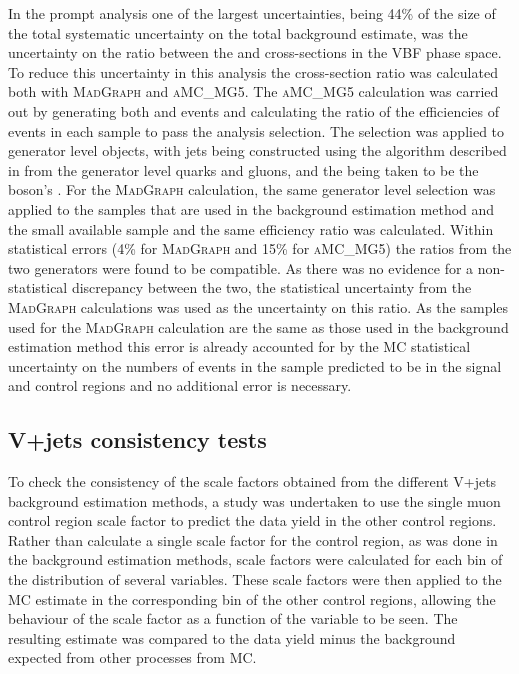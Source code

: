In the prompt analysis one of the largest uncertainties, being 44\% of the size of the total systematic uncertainty on the total background estimate, was the uncertainty on the ratio between the \Zmumu and \Znunu cross-sections in the \ac{VBF} phase space. To reduce this uncertainty in this analysis the cross-section ratio was calculated both with \textsc{MadGraph} and \textsc{aMC\@NLO\_MG5}. The \textsc{aMC\@NLO\_MG5} calculation was carried out by generating both \Zmumu and \Znunu events and calculating the ratio of the efficiencies of events in each sample to pass the analysis selection. The selection was applied to generator level objects, with jets being constructed using the algorithm described in  from the generator level quarks and gluons, and the \MET being taken to be the \PZ boson's \pt. For the \textsc{MadGraph} calculation, the same generator level selection was applied to the \Zmumu samples that are used in the background estimation method and the small available \Znunu sample and the same efficiency ratio was calculated. Within statistical errors (4\% for \textsc{MadGraph} and 15\% for \textsc{aMC\@NLO\_MG5}) the ratios from the two generators were found to be compatible. As there was no evidence for a non-statistical discrepancy between the two, the statistical uncertainty from the \textsc{MadGraph} calculations was used as the uncertainty on this ratio. As the samples used for the \textsc{MadGraph} calculation are the same as those used in the background estimation method this error is already accounted for by the \ac{MC} statistical uncertainty on the numbers of events in the \Zmumu sample predicted to be in the signal and control regions and no additional error is necessary.

\subsection{V+jets consistency tests}
\label{sec:parkedclosure}
To check the consistency of the scale factors obtained from the different V+jets background estimation methods, a study was undertaken to use the single muon control region scale factor to predict the data yield in the other control regions. Rather than calculate a single scale factor for the control region, as was done in the background estimation methods, scale factors were calculated for each bin of the distribution of several variables. These scale factors were then applied to the \ac{MC} estimate in the corresponding bin of the other control regions, allowing the behaviour of the scale factor as a function of the variable to be seen. The resulting estimate was compared to the data yield minus the background expected from other processes from \ac{MC}.

